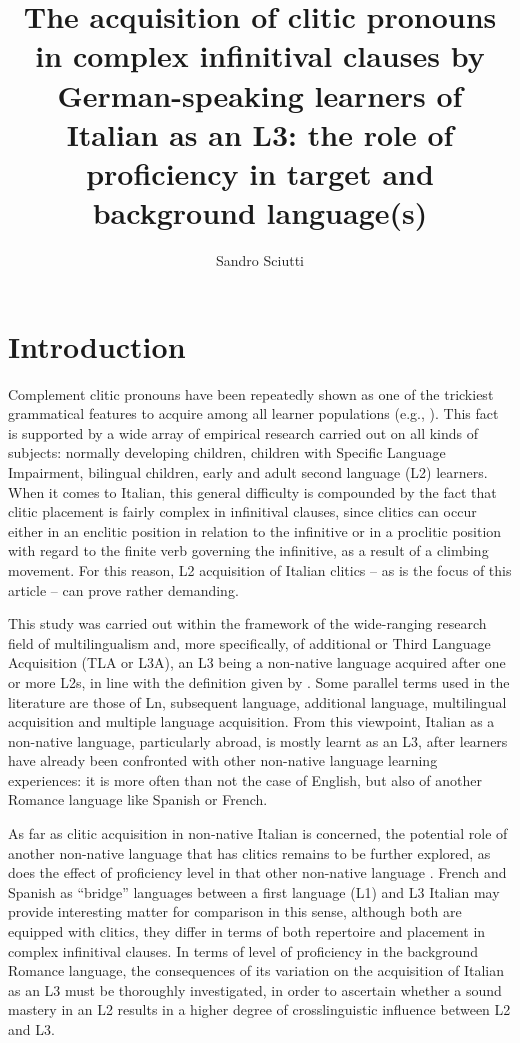 \documentclass[output=paper,modfonts,nonflat,newtxmath]{langsci/langscibook}
\author{Sandro Sciutti\affiliation{{University} {of} Genoa}}
\title{{The} {acquisition} {of} {clitic} {pronouns} {in} {complex} {infinitival} {clauses} {by} {German-speaking} {learners} {of} {Italian} {as} {an} {L3:} {the} {role} {of} {proficiency} {in} {target} {and} {background} {language(s)}}
\begin{document}
\maketitle
{}

\section{Introduction}%
\label{sec:sciutti:1}

Complement clitic pronouns have been repeatedly shown as one of the trickiest grammatical features to acquire among all learner populations (e.g., \citealt{BellettiGuasti2015}). This fact is supported by a wide array of empirical research carried out on all kinds of subjects: normally developing children, children with Specific Language Impairment, bilingual children, early and adult second language (L2) learners. When it comes to Italian, this general difficulty is compounded by the fact that clitic placement is fairly complex in infinitival clauses, since clitics can occur either in an enclitic position in relation to the infinitive or in a proclitic position with regard to the finite verb governing the infinitive, as a result of a climbing movement. For this reason, L2 acquisition of Italian clitics – as is the focus of this article – can prove rather demanding.

This study was carried out within the framework of the wide-ranging research field of multilingualism and, more specifically, of additional or Third Language Acquisition (TLA or L3A), an L3 being a non-native language acquired after one or more L2s, in line with the definition given by \citet[97]{Hammarberg2010}. Some parallel terms used in the literature are those of Ln, subsequent language, additional language, multilingual acquisition and multiple language acquisition. From this viewpoint, Italian as a non-native language, particularly abroad, is mostly learnt as an L3, after learners have already been confronted with other non-native language learning experiences: it is more often than not the case of English, but also of another Romance language like Spanish or French.

As far as clitic acquisition in non-native Italian is concerned, the potential role of another non-native language that has clitics remains to be further explored, as does the effect of proficiency level in that other non-native language \citep[238--239]{Giannini2008}. French and Spanish as “bridge” languages between a first language (L1) and L3 Italian may provide interesting matter for comparison in this sense, although both are equipped with clitics, they differ in terms of both repertoire and placement in complex infinitival clauses. In terms of level of proficiency in the background Romance language, the consequences of its variation on the acquisition of Italian as an L3 must be thoroughly investigated, in order to ascertain whether a sound mastery in an L2 results in a higher degree of crosslinguistic influence between L2 and L3.
\end{document}
